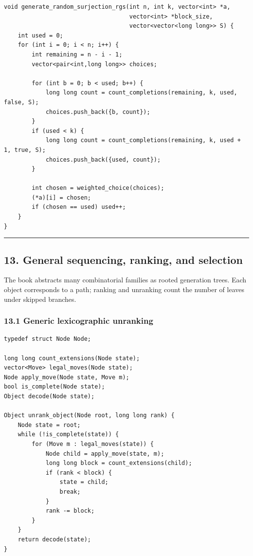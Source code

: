 \documentclass[11pt]{article}
\begin{document}
\begin{verbatim}
void generate_random_surjection_rgs(int n, int k, vector<int> *a,
                                    vector<int> *block_size,
                                    vector<vector<long long>> S) {
    int used = 0;
    for (int i = 0; i < n; i++) {
        int remaining = n - i - 1;
        vector<pair<int,long long>> choices;

        for (int b = 0; b < used; b++) {
            long long count = count_completions(remaining, k, used, false, S);
            choices.push_back({b, count});
        }
        if (used < k) {
            long long count = count_completions(remaining, k, used + 1, true, S);
            choices.push_back({used, count});
        }

        int chosen = weighted_choice(choices);
        (*a)[i] = chosen;
        if (chosen == used) used++;
    }
}
\end{verbatim}

\begin{center}\rule{0.5\linewidth}{0.5pt}\end{center}

\subsection{13. General sequencing, ranking, and selection}\label{general-sequencing-ranking-and-selection}

The book abstracts many combinatorial families as rooted generation trees. Each object corresponds to a path; ranking and unranking count the number of leaves under skipped branches.

\subsubsection{13.1 Generic lexicographic unranking}\label{generic-lexicographic-unranking}

\begin{verbatim}
typedef struct Node Node;

long long count_extensions(Node state);
vector<Move> legal_moves(Node state);
Node apply_move(Node state, Move m);
bool is_complete(Node state);
Object decode(Node state);

Object unrank_object(Node root, long long rank) {
    Node state = root;
    while (!is_complete(state)) {
        for (Move m : legal_moves(state)) {
            Node child = apply_move(state, m);
            long long block = count_extensions(child);
            if (rank < block) {
                state = child;
                break;
            }
            rank -= block;
        }
    }
    return decode(state);
}
\end{verbatim}
\end{document}
